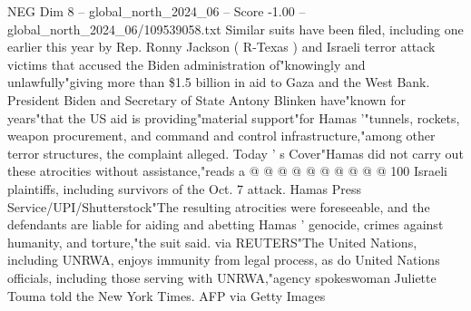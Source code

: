 \begin{textsample}{NEG Dim 8 – global\_north\_2024\_06 – Score -1.00 – global\_north\_2024\_06/109539058.txt}
Similar suits have been filed, including one earlier this year by Rep.
Ronny Jackson ( R-Texas ) and Israeli terror attack victims that accused the Biden administration of"knowingly and unlawfully"giving more than \$1.5 billion in aid to Gaza and the West Bank.
President Biden and Secretary of State Antony Blinken have"known for years"that the US aid is providing"material support"for Hamas '"tunnels, rockets, weapon procurement, and command and control infrastructure,"among other terror structures, the complaint alleged.
Today ' s Cover"Hamas did not carry out these atrocities without assistance,"reads a @ @ @ @ @ @ @ @ @ @ 100 Israeli plaintiffs, including survivors of the Oct. 7 attack.
Hamas Press Service/UPI/Shutterstock"The resulting atrocities were foreseeable, and the defendants are liable for aiding and abetting Hamas ' genocide, crimes against humanity, and torture,"the suit said. via REUTERS"The United Nations, including UNRWA, enjoys immunity from legal process, as do United Nations officials, including those serving with UNRWA,"agency spokeswoman Juliette Touma told the New York Times.
AFP via Getty Images

\end{textsample}
